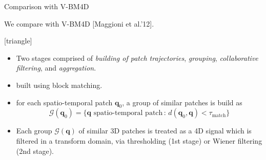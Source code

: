 \documentclass[mathserif, 8pt]{beamer}
\newcommand{\ma}[1]{\boldsymbol{#1}}
\newcommand{\reference}[1] {{\color{gray} [#1]}}
\begin{document}
\begin{frame}{Comparison with V-BM4D}

	We compare with V-BM4D \reference{Maggioni et al.'12}.

	[triangle]

	\begin{itemize}\itemsep=.3cm
		\item Two stages comprised of \emph{building of patch trajectories}, \emph{grouping}, \emph{collaborative
			filtering}, and \emph{aggregation}.
		\item {} built using block matching.
		\item {} for each spatio-temporal patch $\ma q_0$, a
			group of similar patches is build as
			\[\mathcal G(\ma q_0) = \{\ma  q \text{ spatio-temporal patch}\,:\, d(\ma q_0, \ma q) < \tau_{\text{match}}\}\]
		\item {} Each group $\mathcal G(\ma q)$ of similar 3D
			patches is treated as a 4D signal which is filtered in a transform
			domain, via thresholding (1st stage) or Wiener filtering (2nd stage). 
	\end{itemize}

\end{frame}
\end{document}
